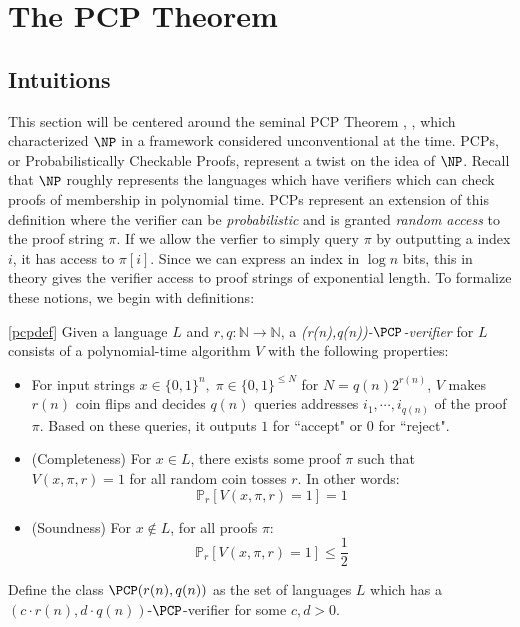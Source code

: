\section{The PCP Theorem}
\subsection{Intuitions}
This section will be centered around the seminal PCP Theorem \cite{arora1998proof}, \cite{arora1998probabilistic}, which characterized $\NP$ in a framework considered unconventional at the time. PCPs, or Probabilistically Checkable Proofs, represent a twist on the idea of $\NP$. Recall that $\NP$ roughly represents the languages which have verifiers which can check proofs of membership in polynomial time. PCPs represent an extension of this definition where the verifier can be \emph{probabilistic} and is granted \emph{random access} to the proof string $\pi$. If we allow the verfier to simply query $\pi$ by outputting a index $i$, it has access to $\pi[i]$. Since we can express an index in $\log{n}$ bits, this in theory gives the verifier access to proof strings of exponential length. To formalize these notions, we begin with definitions:

\begin{definition} \ref{pcpdef}
  Given a language $L$ and $r,q: \mathbb{N} \rightarrow \mathbb{N}$, a \emph{(r(n),q(n))-$\PCP$-verifier} for $L$ consists of a polynomial-time algorithm $V$ with the following properties: \newline

  \begin{itemize}
    \item For input strings $x \in \{0,1\}^n, \; \pi \in \{0,1\}^{\leq N}$ for $N = q(n)2^{r(n)}$, $V$ makes $r(n)$ coin flips and decides $q(n)$ queries addresses $i_1, \cdots, i_{q(n)}$ of the proof $\pi$. Based on these queries, it outputs $1$ for ``accept" or $0$ for ``reject". \newline

    \item (Completeness) For $x \in L$, there exists some proof $\pi$ such that $V(x,\pi,r) = 1$ for all random coin tosses $r$. In other words:
    \begin{equation}
      \mathbb{P}_{r}[V(x,\pi,r) = 1] = 1
    \end{equation}

    \item (Soundness) For $x \not\in L$, for all proofs $\pi$:
    \begin{equation}
      \mathbb{P}_{r}[V(x,\pi,r) = 1] \leq \frac{1}{2}
    \end{equation}
  \end{itemize}
  Define the class $\PCP(r(n),q(n))$ as the set of languages $L$ which has a $(c\cdot r(n),d\cdot q(n))$-$\PCP$-verifier for some $c,d > 0$.
\end{definition}

